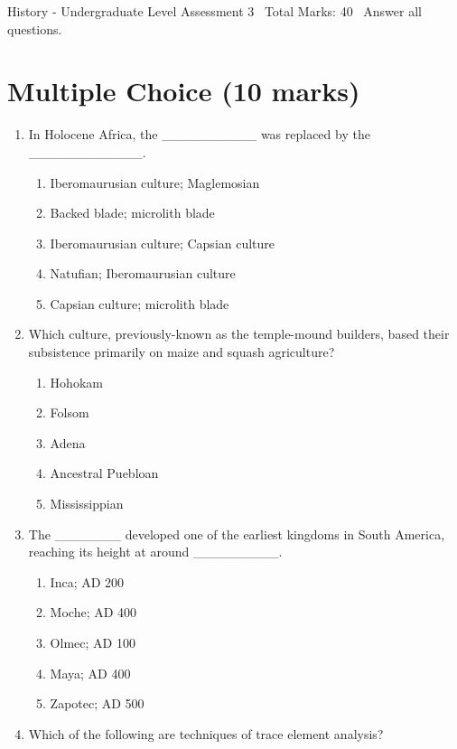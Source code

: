 \documentclass[12pt]{article}
\begin{document}
\begin{center}
History - Undergraduate Level Assessment 3 \
Total Marks: 40 \
Answer all questions.
\end{center}

\section*{Multiple Choice (10 marks)}
\begin{enumerate}[label=\arabic*.]
\item In Holocene Africa, the \_\_\_\_\_\_\_\_\_\_ was replaced by the \_\_\_\_\_\_\_\_\_\_\_\_.
\begin{enumerate}[label=(\alph*)]
    \item Iberomaurusian culture; Maglemosian
    \item Backed blade; microlith blade
    \item Iberomaurusian culture; Capsian culture
    \item Natufian; Iberomaurusian culture
    \item Capsian culture; microlith blade
\end{enumerate}
\item Which culture, previously-known as the temple-mound builders, based their subsistence
primarily on maize and squash agriculture?
\begin{enumerate}[label=(\alph*)]
    \item Hohokam
    \item Folsom
    \item Adena
    \item Ancestral Puebloan
    \item Mississippian
\end{enumerate}
\item The \_\_\_\_\_\_\_ developed one of the earliest kingdoms in South America, reaching its height
at around \_\_\_\_\_\_\_\_\_.
\begin{enumerate}[label=(\alph*)]
    \item Inca; AD 200
    \item Moche; AD 400
    \item Olmec; AD 100
    \item Maya; AD 400
    \item Zapotec; AD 500
\end{enumerate}
\item Which of the following are techniques of trace element analysis?
\begin{enumerate}[label=(\alph*)]

\end{enumerate}
\end{enumerate}
\end{document}
